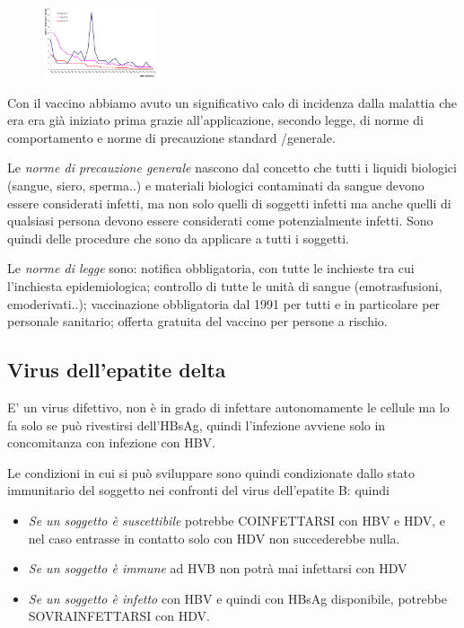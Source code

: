 \begin{figure}[!ht]
\centering
	\includegraphics[width=0.3\textwidth]{11/image4.png}
	\end{figure}

  Con il vaccino abbiamo avuto un significativo calo di incidenza dalla
  malattia che era era già iniziato prima grazie all'applicazione,
  secondo legge, di norme di comportamento e norme di precauzione
  standard /generale.

  Le \emph{norme di precauzione generale} nascono dal concetto che tutti
  i liquidi biologici (sangue, siero, sperma..) e materiali biologici
  contaminati da sangue devono essere considerati infetti, ma non solo
  quelli di soggetti infetti ma anche quelli di qualsiasi persona devono
  essere considerati come potenzialmente infetti. Sono quindi delle
  procedure che sono da applicare a tutti i soggetti.

  Le \emph{norme di legge} sono: notifica obbligatoria, con tutte le
  inchieste tra cui l'inchiesta epidemiologica; controllo di tutte le
  unità di sangue (emotrasfusioni, emoderivati..); vaccinazione
  obbligatoria dal 1991 per tutti e in particolare per personale
  sanitario; offerta gratuita del vaccino per persone a rischio.

\subsection{Virus dell'epatite delta}

  E' un virus difettivo, non è in grado di infettare autonomamente le
  cellule ma lo fa solo se può rivestirsi dell'HBsAg, quindi l'infezione
  avviene solo in concomitanza con infezione con HBV.

  Le condizioni in cui si può sviluppare sono quindi condizionate dallo
  stato immunitario del soggetto nei confronti del virus dell'epatite B:
  quindi

\begin{itemize}
\item
  \emph{Se un soggetto è suscettibile} potrebbe COINFETTARSI con HBV e
  HDV, e nel caso entrasse in contatto solo con HDV non succederebbe
  nulla.
\item
  \emph{Se un soggetto è immune} ad HVB non potrà mai infettarsi con HDV
\item
  \emph{Se un soggetto è infetto} con HBV e quindi con HBsAg
  disponibile, potrebbe SOVRAINFETTARSI con HDV.
\end{itemize}

